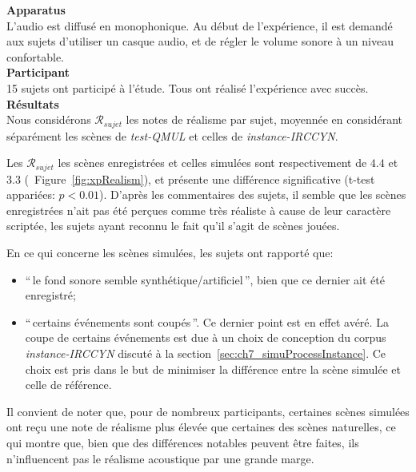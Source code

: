 \textbf{Apparatus} \\

L'audio est diffusé en monophonique. Au début de l'expérience, il est demandé aux sujets d'utiliser un casque audio, et de régler le volume sonore à un niveau confortable.  \\

\textbf{Participant} \\

15 sujets ont participé à l'étude. Tous ont réalisé l'expérience avec succès. \\

\textbf{Résultats} \\

Nous considérons $\mathcal{R}_{sujet}$ les notes de réalisme par sujet, moyennée en considérant séparément les scènes de \emph{test-QMUL} et celles de \emph{instance-IRCCYN}.

Les $\mathcal{R}_{sujet}$ les scènes enregistrées et celles simulées sont respectivement de $4.4$ et $3.3$ (\cf~Figure~\ref{fig:xpRealism}), et présente une différence significative (t-test appariées: $p<0.01$). D'après les commentaires des sujets, il semble que les scènes enregistrées n'ait pas été perçues comme très réaliste à cause de leur caractère scriptée, les sujets ayant reconnu le fait qu'il s'agit de scènes jouées. 

En ce qui concerne les scènes simulées, les sujets ont rapporté que: 

\begin{itemize}
\item ``\,le fond sonore semble synthétique/artificiel\,'',  bien que ce dernier ait été enregistré;
\item ``\,certains événements sont coupés\,''. Ce dernier point est en effet avéré. La coupe de certains événements est due à un choix de conception du corpus \emph{instance-IRCCYN} discuté à la section~\ref{sec:ch7_simuProcessInstance}. Ce choix est pris dans le but de minimiser la différence entre la scène simulée et celle de référence. 
\end{itemize}

Il convient de noter que, pour de nombreux participants, certaines scènes simulées ont reçu une note de réalisme plus élevée que certaines des scènes naturelles, ce qui montre que, bien que des différences notables peuvent être faites, ils n'influencent pas le réalisme acoustique par une grande marge.


